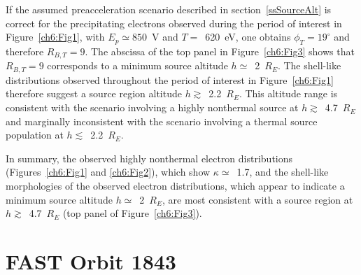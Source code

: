   If the assumed preacceleration scenario described in section~\ref{ssSourceAlt}
  is correct for the precipitating electrons observed during the period of
  interest in Figure~\ref{ch6:Fig1}, with $E_p \simeq 850$~V and $T =$~620~eV,
  one obtains $\phi_T = 19^\circ$ and therefore $R_{B,T} = 9$. The abscissa of
  the top panel in Figure~\ref{ch6:Fig3} shows that $R_{B,T} = 9$ corresponds to
  a minimum source altitude $h \simeq$~2~$R_E$. The shell-like distributions
  observed throughout the period of interest in Figure~\ref{ch6:Fig1} therefore
  suggest a source region altitude $h \gtrsim$~2.2~$R_E$. This altitude range is
  consistent with the scenario involving a highly nonthermal source at
  $h \gtrsim$~4.7~$R_E$ and marginally inconsistent with the scenario involving
  a thermal source population at $h \lesssim$~2.2~$R_E$.

  In summary, the observed highly nonthermal electron distributions
  (Figures~\ref{ch6:Fig1} and \ref{ch6:Fig2}), which show $\kappa \simeq$~1.7,
  and the shell-like morphologies of the observed electron distributions, which
  appear to indicate a minimum source altitude $h \simeq$~2~$R_E$, are most
  consistent with a source region at $h \gtrsim$~4.7~$R_E$ (top panel of
  Figure~\ref{ch6:Fig3}).





  
  \section{FAST Orbit 1843}


